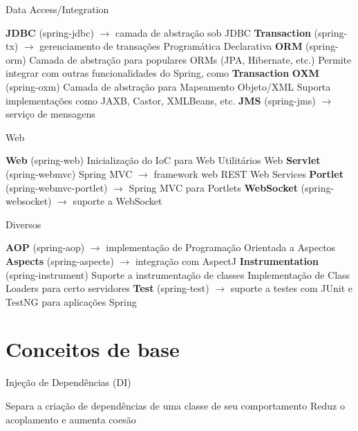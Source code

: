 \documentclass{beamer}
\begin{document}
\begin{frame}{Data Access/Integration}
 \begin{outline}
   \textbf{JDBC} (spring-jdbc) $\rightarrow$ camada de abstração sob JDBC
   \textbf{Transaction} (spring-tx) $\rightarrow$ gerenciamento de transações
    \2 Programática
    \2 Declarativa
   \textbf{ORM} (spring-orm)
    \2 Camada de abstração para populares ORMs (JPA, Hibernate, etc.)
    \2 Permite integrar com outras funcionalidades do Spring, como \textbf{Transaction}
   \textbf{OXM} (spring-oxm)
    \2 Camada de abstração para Mapeamento Objeto/XML
    \2 Suporta implementações como JAXB, Castor, XMLBeans, etc.
   \textbf{JMS} (spring-jms) $\rightarrow$ serviço de mensagens
 \end{outline}
\end{frame}

\begin{frame}{Web}
 \begin{outline}
   \textbf{Web} (spring-web)
    \2 Inicialização do IoC para Web
    \2 Utilitários Web
   \textbf{Servlet} (spring-webmvc)
    \2 Spring MVC $\rightarrow$ framework web
    \2 REST Web Services
   \textbf{Portlet} (spring-webmvc-portlet) $\rightarrow$ Spring MVC para Portlets
   \textbf{WebSocket} (spring-websocket) $\rightarrow$ suporte a WebSocket
 \end{outline}
\end{frame}

\begin{frame}{Diversos}
 \begin{outline}
   \textbf{AOP} (spring-aop) $\rightarrow$ implementação de Programação Orientada a Aspectos
   \textbf{Aspects} (spring-aspects) $\rightarrow$ integração com AspectJ
   \textbf{Instrumentation} (spring-instrument)
    \2 Suporte a instrumentação de classes
    \2 Implementação de Class Loaders para certo servidores
   \textbf{Test} (spring-test) $\rightarrow$ suporte a testes com JUnit e TestNG para aplicações Spring
 \end{outline}
\end{frame}

\section{Conceitos de base}

\begin{frame}{Injeção de Dependências (DI)}
 \begin{outline}
   Separa a criação de dependências de uma classe de seu comportamento
   Reduz o acoplamento e aumenta coesão
 \end{outline}
 \begin{center}
 \end{center}
\end{frame}
\end{document}
